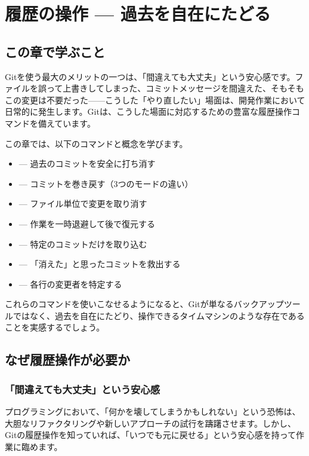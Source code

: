 \chapter{履歴の操作 — 過去を自在にたどる}

\section{この章で学ぶこと}

Gitを使う最大のメリットの一つは、「間違えても大丈夫」という安心感です。ファイルを誤って上書きしてしまった、コミットメッセージを間違えた、そもそもこの変更は不要だった——こうした「やり直したい」場面は、開発作業において日常的に発生します。Gitは、こうした場面に対応するための豊富な履歴操作コマンドを備えています。

この章では、以下のコマンドと概念を学びます。

\begin{itemize}
  \item {} — 過去のコミットを安全に打ち消す
  \item {} — コミットを巻き戻す（3つのモードの違い）
  \item {} — ファイル単位で変更を取り消す
  \item {} — 作業を一時退避して後で復元する
  \item {} — 特定のコミットだけを取り込む
  \item {} — 「消えた」と思ったコミットを救出する
  \item {} — 各行の変更者を特定する
\end{itemize}

これらのコマンドを使いこなせるようになると、Gitが単なるバックアップツールではなく、過去を自在にたどり、操作できるタイムマシンのような存在であることを実感するでしょう。

\section{なぜ履歴操作が必要か}

\subsection{「間違えても大丈夫」という安心感}

プログラミングにおいて、「何かを壊してしまうかもしれない」という恐怖は、大胆なリファクタリングや新しいアプローチの試行を躊躇させます。しかし、Gitの履歴操作を知っていれば、「いつでも元に戻せる」という安心感を持って作業に臨めます。

